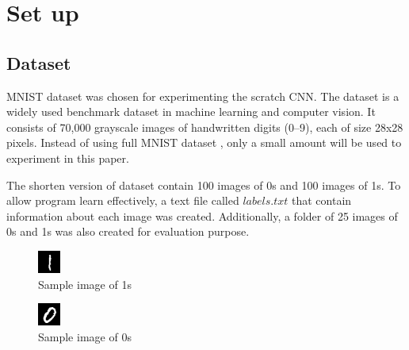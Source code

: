 \documentclass[journal]{IEEEtran} %
\begin{document}
\section{Set up}

\subsection{Dataset}
MNIST dataset was chosen for experimenting the scratch CNN. The dataset is a widely used benchmark dataset in machine learning and computer vision. It consists of 70,000 grayscale images of handwritten digits (0–9), each of size 28x28 pixels. Instead of using full MNIST dataset , only a small amount will be used to experiment in this paper. 

\vspace{5mm}The shorten version of dataset contain 100 images of 0s and 100 images of 1s. To allow program learn effectively, a text file called \(labels.txt\) that contain information about each image was created. Additionally, a folder of 25 images of 0s and 1s was also created for evaluation purpose.

\begin{figure}[h!]
    \centering
    \includegraphics[width=0.5\linewidth]{1_sample.png}
    \caption{Sample image of 1s}
\end{figure}

\begin{figure}[h!]
    \centering
    \includegraphics[width=0.5\linewidth]{0_sample.png}
    \caption{Sample image of 0s}
\end{figure}
\end{document}
